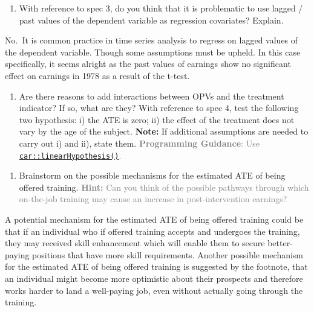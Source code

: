 \documentclass[
]{article}
\providecommand{\tightlist}{%
  \setlength{\itemsep}{0pt}\setlength{\parskip}{0pt}}
\begin{document}
\begin{enumerate}
\def\labelenumi{\alph{enumi}.}
\setcounter{enumi}{2}
\tightlist
\item
  With reference to spec 3, do you think that it is problematic to use
  lagged / past values of the dependent variable as regression
  covariates? Explain.
\end{enumerate}

No.~It is common practice in time series analysis to regress on lagged
values of the dependent variable. Though some assumptions must be
upheld. In this case specifically, it seems alright as the past values
of earnings show no significant effect on earnings in 1978 as a result
of the t-test.

\begin{enumerate}
\def\labelenumi{\alph{enumi}.}
\setcounter{enumi}{3}
\tightlist
\item
  Are there reasons to add interactions between OPVs and the treatment
  indicator? If so, what are they? With reference to spec 4, test the
  following two hypothesis: i) the ATE is zero; ii) the effect of the
  treatment does not vary by the age of the subject. \textbf{Note:} If
  additional assumptions are needed to carry out i) and ii), state them.
  \textcolor{gray}{\textbf{Programming Guidance}: Use \href{https://rdrr.io/cran/car/man/linearHypothesis.html}{\texttt{car::linearHypothesis()}}.}
\end{enumerate}

\begin{enumerate}
\def\labelenumi{\arabic{enumi}.}
\setcounter{enumi}{2}
\tightlist
\item
  Brainstorm on the possible mechanisms for the estimated ATE of being
  offered training.
  \textcolor{gray}{\textbf{Hint:} Can you think of the possible pathways through which on-the-job training may cause an increase in post-intervention earnings?}\label{item:oot:ate-vs-ite}
\end{enumerate}

A potential mechanism for the estimated ATE of being offered training
could be that if an individual who if offered training accepts and
undergoes the training, they may received skill enhancement which will
enable them to secure better-paying positions that have more skill
requirements. Another possible mechanism for the estimated ATE of being
offered training is suggested by the footnote, that an individual might
become more optimistic about their prospects and therefore works harder
to land a well-paying job, even without actually going through the
training.
\end{document}
